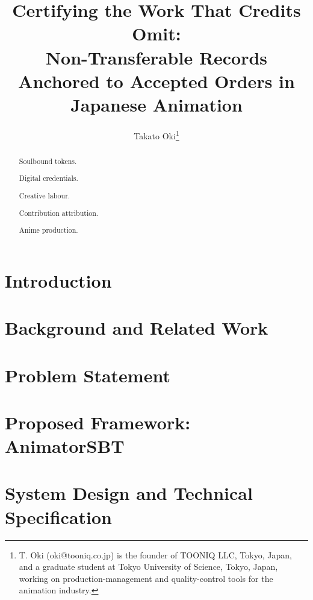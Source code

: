 \documentclass{ledger}
\title{Certifying the Work That Credits Omit:\\
Non-Transferable Records Anchored to Accepted Orders in Japanese Animation}
\author{Takato Oki\thanks{T. Oki (oki@tooniq.co.jp) is the founder of TOONIQ LLC, Tokyo, Japan, and a graduate student at Tokyo University of Science, Tokyo, Japan, working on production-management and quality-control tools for the animation industry.}}
\begin{document}
\maketitle
\thispagestyle{pagefirst}

\begin{abstract}


\begin{keywords}
\item Soulbound tokens.
\item Digital credentials.
\item Creative labour.
\item Contribution attribution.
\item Anime production.
\end{keywords}
\end{abstract}

\renewcommand{\thefootnote}{\arabic{footnote}}
\setcounter{footnote}{0}

\section{Introduction}
\label{sec:introduction}


\section{Background and Related Work}
\label{sec:related_work}


\section{Problem Statement}
\label{sec:problem}


\section{Proposed Framework: AnimatorSBT}
\label{sec:framework}


\section{System Design and Technical Specification}
\label{sec:implementation}

\end{document}
